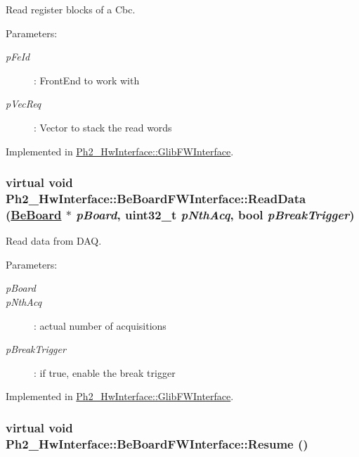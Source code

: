 Read register blocks of a Cbc. 

\begin{Desc}
\item[Parameters:]
\begin{description}
\item[{\em p\-Fe\-Id}]: Front\-End to work with \item[{\em p\-Vec\-Req}]: Vector to stack the read words \end{description}
\end{Desc}


Implemented in \hyperlink{class_ph2___hw_interface_1_1_glib_f_w_interface_9dbc3cf2a991126aed53d834d4d152ce}{Ph2\_\-Hw\-Interface::Glib\-FWInterface}.\hypertarget{class_ph2___hw_interface_1_1_be_board_f_w_interface_e5e2d8bc8a89d205067b230ec7d9d098}{
\subsubsection[ReadData]{\setlength{\rightskip}{0pt plus 5cm}virtual void Ph2\_\-Hw\-Interface::Be\-Board\-FWInterface::Read\-Data (\hyperlink{class_ph2___hw_description_1_1_be_board}{Be\-Board} $\ast$ {\em p\-Board}, uint32\_\-t {\em p\-Nth\-Acq}, bool {\em p\-Break\-Trigger})}}
\label{class_ph2___hw_interface_1_1_be_board_f_w_interface_e5e2d8bc8a89d205067b230ec7d9d098}


Read data from DAQ. 

\begin{Desc}
\item[Parameters:]
\begin{description}
\item[{\em p\-Board}]\item[{\em p\-Nth\-Acq}]: actual number of acquisitions \item[{\em p\-Break\-Trigger}]: if true, enable the break trigger \end{description}
\end{Desc}


Implemented in \hyperlink{class_ph2___hw_interface_1_1_glib_f_w_interface_26c35fec3518f40d09ebc7f0114be19b}{Ph2\_\-Hw\-Interface::Glib\-FWInterface}.\hypertarget{class_ph2___hw_interface_1_1_be_board_f_w_interface_5d48a64b90e48d8bd897fca48482baf8}{
\subsubsection[Resume]{\setlength{\rightskip}{0pt plus 5cm}virtual void Ph2\_\-Hw\-Interface::Be\-Board\-FWInterface::Resume ()}}
\label{class_ph2___hw_interface_1_1_be_board_f_w_interface_5d48a64b90e48d8bd897fca48482baf8}


